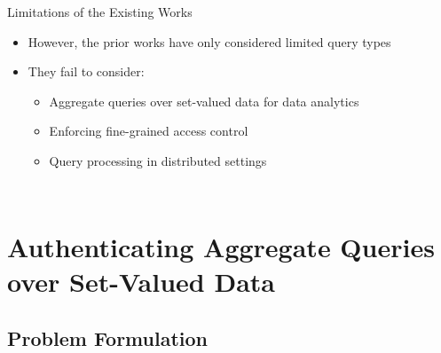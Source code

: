 \documentclass[xcolor={dvipsnames},aspectratio=169,10pt]{beamer}
\begin{document}
\begin{frame}{Limitations of the Existing Works}
  \begin{itemize}[<+->]
    \item However, the prior works have only considered \alert{limited query types}
    \item They fail to consider:
      \begin{itemize}[<+- | alert@+>]
        \item Aggregate queries over set-valued data for data analytics
        \item Enforcing fine-grained access control
        \item Query processing in distributed settings
      \end{itemize}
  \end{itemize}

  \begin{columns}[b]
    \begin{column}{0.33\linewidth}
      \begin{figure}
      \end{figure}
    \end{column}
    \begin{column}{0.33\linewidth}
      \begin{figure}
      \end{figure}
    \end{column}
    \begin{column}{0.33\linewidth}
      \begin{figure}
      \end{figure}
    \end{column}
  \end{columns}
\end{frame}

\section{Authenticating Aggregate Queries over Set-Valued Data}

\subsection{Problem Formulation}
\end{document}

